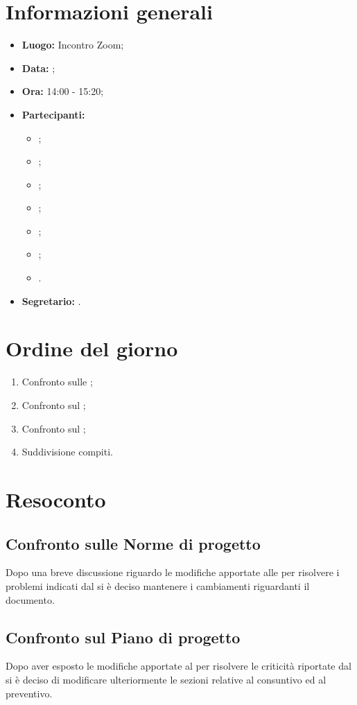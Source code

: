 \section{Informazioni generali}
\begin{itemize}
	\item \textbf{Luogo:} Incontro Zoom;
	\item \textbf{Data:} \Data;
	\item \textbf{Ora:} 14:00 - 15:20;
	\item \textbf{Partecipanti:}
	\begin{itemize}
		\item \BL{}; 
		\item \FF{};
		\item \MM{}; 
		\item \PC{};
		\item \TG{};
		\item \TL{};
		\item \VD{}.
	\end{itemize} 
	\item \textbf{Segretario:} \PC{}.
\end{itemize}

\section{Ordine del giorno}
\begin{enumerate}
	\item Confronto sulle \NdP{};
	\item Confronto sul \PdP{};
	\item Confronto sul \PdQ{};
	\item Suddivisione compiti.
\end{enumerate}

\section{Resoconto}
\subsection{Confronto sulle Norme di progetto}
Dopo una breve discussione riguardo le modifiche apportate alle \NdP{} per risolvere i problemi indicati dal \VT{} si è deciso mantenere i cambiamenti riguardanti il documento.
\subsection{Confronto sul Piano di progetto}
Dopo aver esposto le modifiche apportate al \PdP{} per risolvere le criticità riportate dal \VT{} si è deciso di modificare ulteriormente le sezioni relative al consuntivo ed al preventivo.
